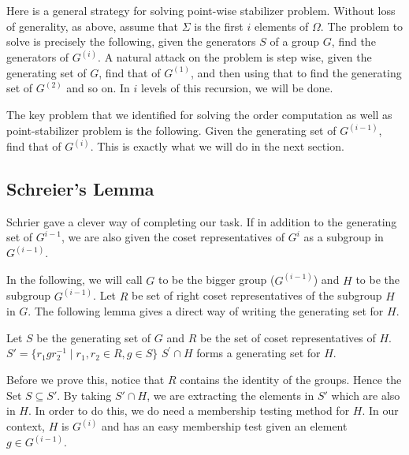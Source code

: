 Here is a general strategy for solving point-wise stabilizer problem. Without loss of generality, as above, assume that $\Sigma$ is the first $i$ elements of $\Omega$. The problem to solve is precisely the following, given the generators $S$ of a group $G$, find the generators of $G^{(i)}$. A natural attack on the problem is step wise, given the generating set of $G$, find that of $G^{(1)}$, and then using that to find the generating set of $G^{(2)}$ and so on. In $i$ levels of this recursion, we will be done.

The key problem that we identified for solving the order computation as well as point-stabilizer problem is the following. Given the generating set of $G^{(i-1)}$, find that of $G^{(i)}$. This is exactly what we will do in the next section.

\subsection{Schreier's Lemma}

Schrier gave a clever way of completing our task. If in addition to the generating set of $G^{i-1}$, we are also given the coset representatives of $G^{i}$ as a subgroup in $G^{(i-1)}$.

In the following, we will call $G$ to be the bigger group ($G^{(i-1)}$) and $H$ to be the subgroup $G^{(i-1)}$. Let $R$ be set of right coset representatives of the subgroup $H$ in $G$. 
The following lemma gives a direct way of writing the generating set for $H$. 

\begin{lemma}
Let $S$ be the generating set of $G$ and $R$ be 
the set of coset representatives of $H$.
$S' = \lbrace r_1 g r_2^{-1} \mid r_1, r_2 \in R, g \in S \rbrace$ 
$S^\prime \cap H$ forms a generating set for $H$.
\end{lemma}
Before we prove this, notice that $R$ contains the identity of the groups. Hence the Set $S \subseteq S'$. By taking $S' \cap H$, we are extracting the elements in $S'$ which are also in $H$. In order to do this, we do need a membership testing method for $H$. In our context, $H$ is $G^{(i)}$ and has an easy membership test given an element $g \in G^{(i-1)}$.

